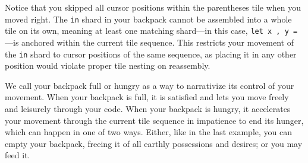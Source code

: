 

Notice that you skipped all cursor positions within
the parentheses tile when you moved right.
The \texttt{in} shard in your backpack cannot be assembled into
a whole tile on its own, meaning at least one matching shard---in
this case, \texttt{let x , y =}---is
anchored within the current tile sequence.
This restricts your movement of the \texttt{in}
shard to cursor positions of the same sequence,
as placing it in any other position would
violate proper tile nesting on reassembly.



We call your backpack full or hungry as a way
to narrativize its control of your movement.
When your backpack is full, it is satisfied
and lets you move freely and leisurely through
your code.
When your backpack is hungry, it accelerates your
movement through the current tile sequence
in impatience to end its hunger, which can happen in one of two ways.
Either, like in the last example, you can empty your backpack,
freeing it of all earthly possessions and desires;
or you may feed it.




